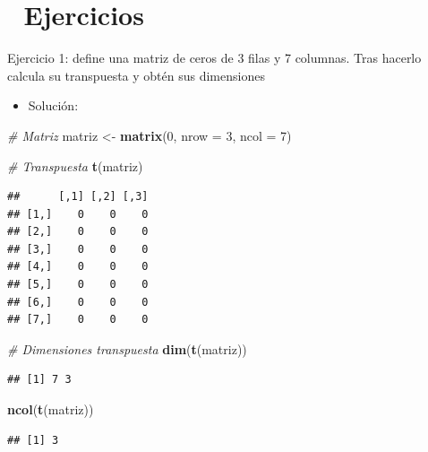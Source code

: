 \documentclass[11pt,]{book}
\newenvironment{Shaded}{\begin{snugshade}}{\end{snugshade}}
\newcommand{\CommentTok}[1]{\textcolor[rgb]{0.37,0.37,0.37}{\textit{#1}}}
\newcommand{\DataTypeTok}[1]{\textcolor[rgb]{0.27,0.27,0.27}{#1}}
\newcommand{\DecValTok}[1]{\textcolor[rgb]{0.06,0.06,0.06}{#1}}
\newcommand{\KeywordTok}[1]{\textcolor[rgb]{0.27,0.27,0.27}{\textbf{#1}}}
\newcommand{\NormalTok}[1]{#1}
\newcommand{\StringTok}[1]{\textcolor[rgb]{0.5,0.5,0.5}{#1}}
\providecommand{\tightlist}{%
  \setlength{\itemsep}{0pt}\setlength{\parskip}{0pt}}
\begin{document}
\hypertarget{ejercicios-2}{%
\section{📝 Ejercicios}\label{ejercicios-2}}

Ejercicio 1: define una matriz de ceros de 3 filas y 7 columnas. Tras hacerlo calcula su transpuesta y obtén sus dimensiones

\begin{itemize}
\tightlist
\item
  Solución:
\end{itemize}

\begin{Shaded}
\begin{Highlighting}[]
\CommentTok{# Matriz}
\NormalTok{matriz <-}\StringTok{ }\KeywordTok{matrix}\NormalTok{(}\DecValTok{0}\NormalTok{, }\DataTypeTok{nrow =} \DecValTok{3}\NormalTok{, }\DataTypeTok{ncol =} \DecValTok{7}\NormalTok{)}

\CommentTok{# Transpuesta}
\KeywordTok{t}\NormalTok{(matriz)}
\end{Highlighting}
\end{Shaded}

\begin{verbatim}
##      [,1] [,2] [,3]
## [1,]    0    0    0
## [2,]    0    0    0
## [3,]    0    0    0
## [4,]    0    0    0
## [5,]    0    0    0
## [6,]    0    0    0
## [7,]    0    0    0
\end{verbatim}

\begin{Shaded}
\begin{Highlighting}[]
\CommentTok{# Dimensiones transpuesta}
\KeywordTok{dim}\NormalTok{(}\KeywordTok{t}\NormalTok{(matriz))}
\end{Highlighting}
\end{Shaded}

\begin{verbatim}
## [1] 7 3
\end{verbatim}

\begin{Shaded}
\begin{Highlighting}[]
\KeywordTok{ncol}\NormalTok{(}\KeywordTok{t}\NormalTok{(matriz))}
\end{Highlighting}
\end{Shaded}

\begin{verbatim}
## [1] 3
\end{verbatim}
\end{document}
